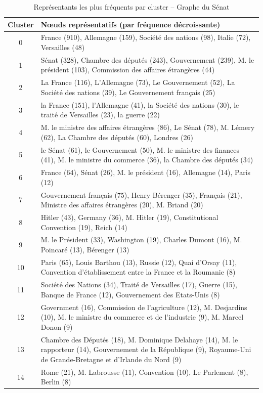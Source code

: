\documentclass[a4paper,twoside,12pt]{book}
\begin{document}
\begin{table}[htbp]
\centering
\begin{tabular}{|c|p{12cm}|}
\hline
\textbf{Cluster} & \textbf{Nœuds représentatifs (par fréquence décroissante)} \\
\hline
0 & France (910), Allemagne (159), Société des nations (98), Italie (72), Versailles (48) \\
1 & Sénat (328), Chambre des députés (243), Gouvernement (239), M. le président (103), Commission des affaires étrangères (44) \\
2 & La France (116), L'Allemagne (73), Le Gouvernement (52), La Société des nations (39), Le Gouvernement français (25) \\
3 & la France (151), l'Allemagne (41), la Société des nations (30), le traité de Versailles (23), la guerre (22) \\
4 & M. le ministre des affaires étrangères (86), Le Sénat (78), M. Lémery (62), La Chambre des députés (60), Londres (26) \\
5 & le Sénat (61), le Gouvernement (50), M. le ministre des finances (41), M. le ministre du commerce (36), la Chambre des députés (34) \\
6 & France (64), Sénat (26), M. le président (16), Allemagne (14), Paris (12) \\
7 & Gouvernement français (75), Henry Bérenger (35), Français (21), Ministre des affaires étrangères (20), M. Briand (20) \\
8 & Hitler (43), Germany (36), M. Hitler (19), Constitutional Convention (19), Reich (14) \\
9 & M. le Président (33), Washington (19), Charles Dumont (16), M. Poincaré (13), Bérenger (13) \\
10 & Paris (65), Louis Barthou (13), Russie (12), Quai d'Orsay (11), Convention d'établissement entre la France et la Roumanie (8) \\
11 & Société des Nations (34), Traité de Versailles (17), Guerre (15), Banque de France (12), Gouvernement des Etats-Unis (8) \\
12 & Government (16), Commission de l'agriculture (12), M. Desjardins (10), M. le ministre du commerce et de l'industrie (9), M. Marcel Donon (9) \\
13 & Chambre des Députés (18), M. Dominique Delahaye (14), M. le rapporteur (14), Gouvernement de la République (9), Royaume-Uni de Grande-Bretagne et d'Irlande du Nord (9) \\
14 & Rome (21), M. Labrousse (11), Convention (10), Le Parlement (8), Berlin (8) \\
\hline
\end{tabular}

\vspace{0.5em}
\caption{Représentants les plus fréquents par cluster – Graphe du Sénat}
\label{tab:clusters-nœuds}
\end{table}
\end{document}
